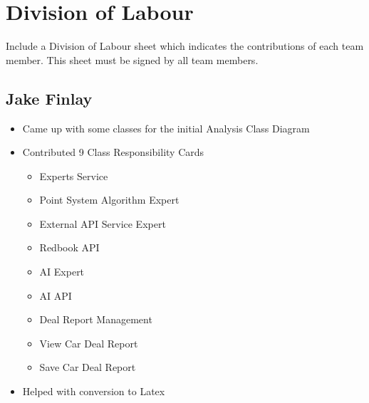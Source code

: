 \documentclass[]{article}
\begin{document}
\appendix
\section{Division of Labour}
\label{sec:division_of_labour}
Include a Division of Labour sheet which indicates the contributions of each team member. This sheet must be signed by all team members.
\subsection{Jake Finlay}
\begin{itemize}
    \item Came up with some classes for the initial Analysis Class Diagram
	\item Contributed 9 Class Responsibility Cards
	\begin{itemize}
		\item Experts Service
		\item Point System Algorithm Expert
		\item External API Service Expert
		\item Redbook API
		\item AI Expert
		\item AI API
		\item Deal Report Management
		\item View Car Deal Report
		\item Save Car Deal Report
	\end{itemize}
	\item Helped with conversion to Latex
\end{itemize}
\end{document}

